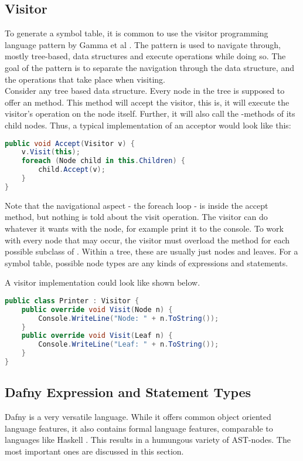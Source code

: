 
\subsection{Visitor}
To generate a symbol table, it is common to use the visitor programming language pattern by Gamma et al \cite{gofBook}.
The pattern is used to navigate through, mostly tree-based, data structures and execute operations while doing so.
The goal of the pattern is to separate the navigation through the data structure, and the operations that take place when visiting.\\

Consider any tree based data structure.
Every node in the tree is supposed to offer an  method.
This method will accept the visitor, this is, it will execute the visitor's operation on the node itself.
Further, it will also call the -methods of its child nodes.
Thus, a typical implementation of an acceptor would look like this:

\begin{lstlisting}[language=csharp, caption={Example for Accept}, captionpos=b, label={lst:accept}]
public void Accept(Visitor v) {
    v.Visit(this);
    foreach (Node child in this.Children) {
        child.Accept(v);
    }
}
\end{lstlisting}

Note that the navigational aspect - the foreach loop - is inside the accept method, but nothing is told about the visit operation.
The visitor can do whatever it wants with the node, for example print it to the console.
To work with every node that may occur, the visitor must overload the  method for each possible subclass of .
Within a tree, these are usually just nodes and leaves.
For a symbol table, possible node types are any kinds of expressions and statements.

A visitor implementation could look like shown below.

\begin{lstlisting}[language=csharp, caption={Example for Visitor}, captionpos=b, label={lst:visitor}]
public class Printer : Visitor {
    public override void Visit(Node n) {
        Console.WriteLine("Node: " + n.ToString());
    }
    public override void Visit(Leaf n) {
        Console.WriteLine("Leaf: " + n.ToString());
    }
}
\end{lstlisting}

\subsection{Dafny Expression and Statement Types}
\label{section:analysis_dafnyASTStuff}
Dafny is a very versatile language.
While it offers common object oriented language features, it also contains formal language features, comparable to languages like Haskell \cite{haskell}.
This results in a humungous variety of AST-nodes.
The most important ones are discussed in this section.\\

